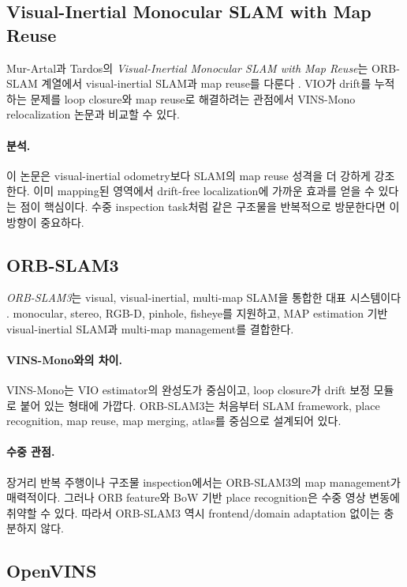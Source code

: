 \documentclass[11pt,a4paper]{article}
\newcommand{\paper}[1]{\textit{#1}}
\begin{document}
\subsection{Visual-Inertial Monocular SLAM with Map Reuse}

Mur-Artal과 Tardos의 \paper{Visual-Inertial Monocular SLAM with Map Reuse}는 ORB-SLAM 계열에서 visual-inertial SLAM과 map reuse를 다룬다 \cite{murartal2017mapreuse}.
VIO가 drift를 누적하는 문제를 loop closure와 map reuse로 해결하려는 관점에서 VINS-Mono relocalization 논문과 비교할 수 있다.

\paragraph{분석.}
이 논문은 visual-inertial odometry보다 SLAM의 map reuse 성격을 더 강하게 강조한다.
이미 mapping된 영역에서 drift-free localization에 가까운 효과를 얻을 수 있다는 점이 핵심이다.
수중 inspection task처럼 같은 구조물을 반복적으로 방문한다면 이 방향이 중요하다.

\subsection{ORB-SLAM3}

\paper{ORB-SLAM3}는 visual, visual-inertial, multi-map SLAM을 통합한 대표 시스템이다 \cite{campos2021orbslam3}.
monocular, stereo, RGB-D, pinhole, fisheye를 지원하고, MAP estimation 기반 visual-inertial SLAM과 multi-map management를 결합한다.

\paragraph{VINS-Mono와의 차이.}
VINS-Mono는 VIO estimator의 완성도가 중심이고, loop closure가 drift 보정 모듈로 붙어 있는 형태에 가깝다.
ORB-SLAM3는 처음부터 SLAM framework, place recognition, map reuse, map merging, atlas를 중심으로 설계되어 있다.

\paragraph{수중 관점.}
장거리 반복 주행이나 구조물 inspection에서는 ORB-SLAM3의 map management가 매력적이다.
그러나 ORB feature와 BoW 기반 place recognition은 수중 영상 변동에 취약할 수 있다.
따라서 ORB-SLAM3 역시 frontend/domain adaptation 없이는 충분하지 않다.

\subsection{OpenVINS}
\end{document}
